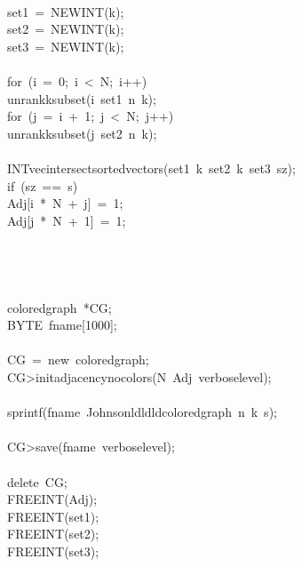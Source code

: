 \begin{tabbing}
\\[0pt]
\>set1\ =\ NEWINT(k);\\[0pt]
\>set2\ =\ NEWINT(k);\\[0pt]
\>set3\ =\ NEWINT(k);\\[0pt]
\>\\[0pt]
\>for\ (i\ =\ 0;\ i\ <\ N;\ i++)\ \\[0pt]
\>\>unrankksubset(i\ set1\ n\ k);\\[0pt]
\>\>for\ (j\ =\ i\ +\ 1;\ j\ <\ N;\ j++)\ \\[0pt]
\>\>\>unrankksubset(j\ set2\ n\ k);\\[0pt]
\\[0pt]
\>\>\>INTvecintersectsortedvectors(set1\ k\ set2\ k\ set3\ sz);\\[0pt]
\>\>\>if\ (sz\ ==\ s)\ \\[0pt]
\>\>\>\>Adj[i\ *\ N\ +\ j]\ =\ 1;\\[0pt]
\>\>\>\>Adj[j\ *\ N\ +\ 1]\ =\ 1;\\[0pt]
\>\>\>\>\\[0pt]
\>\>\>\\[0pt]
\>\>\\[0pt]
\\[0pt]
\>coloredgraph\ *CG;\\[0pt]
\>BYTE\ fname[1000];\\[0pt]
\\[0pt]
\>CG\ =\ new\ coloredgraph;\\[0pt]
\>CG>initadjacencynocolors(N\ Adj\ verboselevel);\\[0pt]
\\[0pt]
\>sprintf(fname\ Johnsonldldldcoloredgraph\ n\ k\ s);\\[0pt]
\\[0pt]
\>CG>save(fname\ verboselevel);\\[0pt]
\\[0pt]
\>delete\ CG;\\[0pt]
\>FREEINT(Adj);\\[0pt]
\>FREEINT(set1);\\[0pt]
\>FREEINT(set2);\\[0pt]
\>FREEINT(set3);\\[0pt]
\\[0pt]
\\[0pt]
\end{tabbing}
